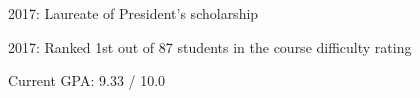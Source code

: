 

\begin{cventries}

\cventry
{} 
{}
{}
{} 
{
 \begin{cvitems}
\item{2017: Laureate of President’s scholarship}
\item {2017: Ranked 1st out of 87 students in the course difficulty rating}
\item {Current GPA: 9.33 / 10.0}
 \end{cvitems}
}

\end{cventries}
